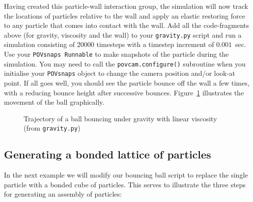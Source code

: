 Having created this particle-wall interaction group, the simulation will now track the locations of particles relative to the wall and apply an elastic restoring force to any particle that comes into contact with the wall. Add all the code-fragments above (for gravity, viscosity and the wall) to your \texttt{gravity.py} script and run a simulation consisting of 20000 timesteps with a timestep increment of $0.001$~sec. Use your \texttt{POVsnaps Runnable} to make snapshots of the particle during the simulation. You may need to call the \texttt{povcam.configure()} subroutine when you initialise your \texttt{POVsnaps} object to change the camera position and/or look-at point. If all goes well, you should see the particle bounce off the wall a few times, with a reducing bounce height after successive bounces. Figure~\ref{fig:bouncy_ball} illustrates the movement of the ball graphically.

\begin{figure}
\begin{center}
\end{center}
\caption{Trajectory of a ball bouncing under gravity with linear viscosity (from \texttt{gravity.py})} \label{fig:bouncy_ball}
\end{figure}

\subsection{Generating a bonded lattice of particles}

In the next example we will modify our bouncing ball script to replace the single particle with a bonded cube of particles. This serves to illustrate the three steps for generating an assembly of particles:

